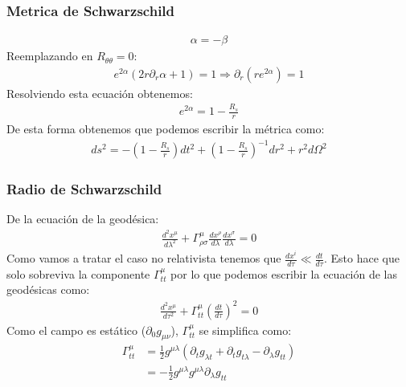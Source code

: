 \documentclass{beamer}
\begin{document}
\begin{frame}
\frametitle{Metrica de Schwarzschild}
\begin{gather*}
  \alpha = - \beta  
\end{gather*}
Reemplazando en $ R _{\theta \theta }  = 0  $: 
\begin{gather*}
  e ^ {2\alpha }(2r \partial_r \alpha + 1 ) = 1 \Longrightarrow \partial_r (r e ^ {2\alpha }) = 1 
\end{gather*}
Resolviendo esta ecuación obtenemos: 
\begin{gather*}
  e ^ {2\alpha } = 1 - \frac{R_s }{r } 
\end{gather*}
De esta forma obtenemos que podemos escribir la métrica como: 
\begin{gather*}
  ds^2 = - \left(1 - \frac{R_s }{r }\right)dt^2 + \left(1 - \frac{R_s }{r}\right) ^ {-1 } dr^2 + r^2 d \Omega^2  
\end{gather*}
\end{frame}




\begin{frame}
\frametitle{Radio de Schwarzschild}
De la ecuación de la geodésica: 
\begin{gather*}
  \frac{d ^2 x ^ {\mu } }{d \lambda^2 } + \Gamma _{\rho \sigma } ^ {\mu} \frac{d x^\rho  }{d \lambda} \frac{d x ^ {\sigma} }{d \lambda} = 0 
\end{gather*}
Como vamos a tratar el caso no relativista tenemos que $ \frac{d x ^ {i } }{d \tau } \ll \frac{d t  }{d \tau } $. Esto hace que solo sobreviva la componente $ \Gamma _{tt } ^ {\mu } $ por lo que podemos escribir la ecuación de las geodésicas como: 
\begin{gather*}
  \frac{d ^2 x ^ {\mu } }{d \tau^2 } + \Gamma _{tt } ^ {\mu } \left(\frac{d t  }{d \tau }\right)^2 = 0  
\end{gather*}
Como el campo es estático ($ \partial _0 g _{\mu \nu }  $), $ \Gamma _{tt } ^ {\mu } $ se simplifica como: 
\begin{align*}
  \Gamma _{tt } ^ {\mu } &= \frac{1}{2} g ^ {\mu \lambda} (\partial_t g _{\lambda t } + \partial_t g _{t \lambda} - \partial_\lambda g _{tt }  ) \\
    &= - \frac{1}{2} g ^ {\mu\lambda} g ^{\mu\lambda} \partial_\lambda g _{tt} 
\end{align*}
\end{frame}


\end{document}
